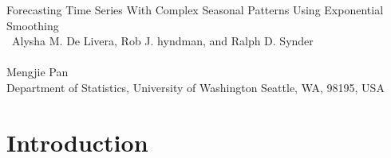 \documentclass{uwstat572}
\begin{document}

\begin{center}
  {\LARGE Forecasting Time Series With Complex Seasonal Patterns Using Exponential Smoothing  }\\\ 
  {\large Alysha M. De Livera, Rob J. hyndman, and Ralph D. Synder}\\\ \\
  {Mengjie Pan \\ 
    Department of Statistics, University of Washington Seattle, WA, 98195, USA
  }
\end{center}



\section{Introduction}
\end{document}
